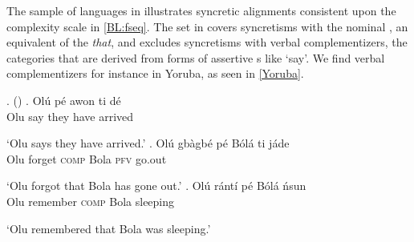 The sample of languages in  illustrates syncretic alignments consistent upon the complexity scale in \ref{BL:fseq}.    The set in  covers syncretisms with the nominal , an equivalent of the  \textit{that}, and excludes syncretisms with verbal complementizers, the categories that are derived from forms of assertive s like `say'. We find verbal complementizers for instance in Yoruba, as seen in \ref{Yoruba}.

\ex.  (\citealt[75]{Lawal1991})\label{Yoruba}
\ag. 
Ol\'u p\'e awon ti d\'e\\
Olu say they have arrived\\
\strut `Olu says they have arrived.'
\bg.
Ol\'u gb\`agb\'e p\'e B\'ol\'a ti j\'ade\\
Olu forget \textsc{comp} Bola \textsc{pfv} go.out\\
\strut `Olu forgot that Bola has gone out.'
\cg.
Ol\'u r\'ant\'i p\'e B\'ol\'a \'nsun\\
Olu remember \textsc{comp} Bola sleeping\\
\strut `Olu remembered that Bola was sleeping.' 

